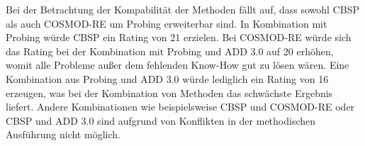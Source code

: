 Bei der Betrachtung der Kompabilit\"at der Methoden f\"allt auf, dass sowohl CBSP als auch COSMOD-RE um Probing erweiterbar sind. In Kombination mit Probing w\"urde CBSP ein Rating von 21 erzielen. Bei COSMOD-RE w\"urde sich das Rating bei der Kombination mit Probing und ADD 3.0 auf 20 erh\"ohen, womit alle Probleme au\ss{}er dem fehlenden Know-How gut zu l\"osen w\"aren. Eine Kombination aus Probing und ADD 3.0 w\"urde lediglich ein Rating von 16 erzeugen, was bei der Kombination von Methoden das schw\"achste Ergebnis liefert. Andere Kombinationen wie beispielsweise CBSP und COSMOD-RE oder CBSP und ADD 3.0 sind aufgrund von Konflikten in der methodischen Ausf\"uhrung nicht m\"oglich. \\
